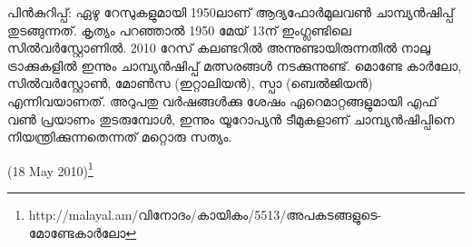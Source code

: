 പിന്‍കുറിപ്പ്: ഏഴു റേസുകളുമായി 1950ലാണ് ആദ്യഫോര്‍മുലവണ്‍ ചാമ്പ്യന്‍ഷിപ്പ് തുടങ്ങുന്നത്. കൃത്യം പറഞ്ഞാല്‍ 
1950 മേയ് 13ന് ഇംഗ്ലണ്ടിലെ സില്‍വര്‍സ്റ്റോണില്‍. 2010 റേസ് കലണ്ടറില്‍ അന്നുണ്ടായിരുന്നതില്‍ നാലു 
ട്രാക്കുകളില്‍ ഇന്നും ചാമ്പ്യന്‍ഷിപ്പ് മത്സരങ്ങള്‍ നടക്കുന്നുണ്ട്. മൊണ്ടേ കാര്‍ലോ, സില്‍വര്‍സ്റ്റോണ്‍, മോണ്‍സ 
(ഇറ്റാലിയന്‍), സ്പാ (ബെല്‍ജിയന്‍) എന്നിവയാണത്. അറുപതു വര്‍ഷങ്ങള്‍ക്കു ശേഷം ഏറെമാറ്റങ്ങളുമായി എഫ് 
വണ്‍ പ്രയാണം തുടരുമ്പോള്‍, ഇന്നും യൂറോപ്യന്‍ ടീമുകളാണ് ചാമ്പ്യന്‍ഷിപ്പിനെ നിയന്ത്രിക്കുന്നതെന്നത് മറ്റൊരു 
സത്യം.

(18 May 2010)\footnote{http://malayal.am/വിനോദം/കായികം/5513/അപകടങ്ങളുടെ-മോണ്ടേകാര്‍ലോ}

\newpage
